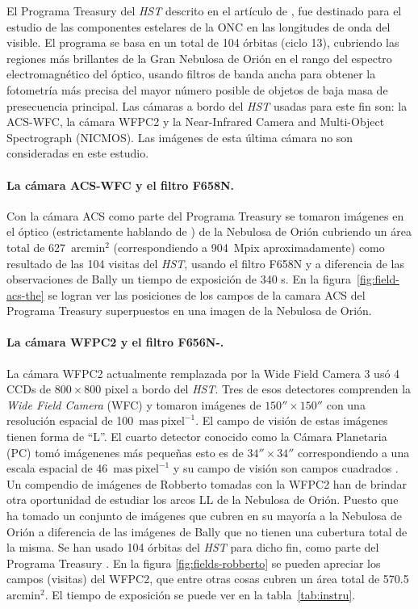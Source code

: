 El Programa Treasury del \textit{HST} descrito en el artículo de \citet{Robberto:2013a}, fue destinado para el estudio de las componentes estelares de la ONC en las longitudes de onda del visible. El programa se basa en un total de 104 órbitas (ciclo 13), cubriendo las regiones más brillantes de la Gran Nebulosa de Orión en el rango del espectro electromagnético del óptico, usando filtros de banda ancha para obtener la fotometría más precisa del mayor número posible de objetos de baja masa de presecuencia principal. Las cámaras a bordo del \textit{HST} usadas para este fin son: la ACS-WFC, la cámara WFPC2 y la Near-Infrared Camera and Multi-Object Spectrograph (NICMOS). Las imágenes de esta última cámara no son consideradas en este estudio. \\    

\paragraph{La cámara ACS-WFC y el filtro F658N.}
Con la cámara ACS como parte del Programa Treasury se tomaron imágenes en el óptico (estrictamente hablando de \ha{}) de la Nebulosa de Orión cubriendo un área total de 627~\(\mathrm{arcmin^2}\) (correspondiendo a 904~Mpix aproximadamente) como resultado de las 104 visitas del \textit{HST}, usando el filtro F658N y a diferencia de las observaciones de Bally un tiempo de exposición de 340 s. En la figura~\ref{fig:field-acs-the} se logran ver las posiciones de los campos de la camara ACS del Programa Treasury superpuestos en una imagen de la Nebulosa de Orión. \\

\paragraph{La cámara WFPC2 y el filtro F656N-\ha{}.}
La cámara WFPC2 actualmente remplazada por la Wide Field Camera 3 usó 4 CCDs de $800\times800$ pixel a bordo del \textit{HST}. Tres de esos detectores comprenden la \textit{Wide Field Camera} (WFC) y tomaron imágenes de \(150''\times150''\) con una resolución espacial de 100~\(\mathrm{mas~pixel^{-1}}\). El campo de visión de estas imágenes tienen forma de ``L''. El cuarto detector conocido como la  Cámara Planetaria (PC) tomó imágenenes más pequeñas esto es de \(34''\times34''\) correspondiendo a una escala espacial de 46~\(\mathrm{mas~pixel^{-1}}\) y su campo de visión son campos cuadrados \citep{McMaster:2008}. Un compendio de imágenes de Robberto tomadas con la WFPC2 han de brindar otra oportunidad de estudiar los arcos LL de la Nebulosa de Orión. Puesto que ha tomado un conjunto de imágenes que cubren en su mayoría a la Nebulosa de Orión a diferencia de las imágenes de Bally que no tienen una cubertura total de la misma. Se han usado 104 órbitas del \textit{HST} para dicho fin, como parte del Programa Treasury \citep{Robberto:2013a}. En la figura \ref{fig:fields-robberto} se pueden apreciar los campos (visitas) del WFPC2, que entre otras cosas cubren un área total de 570.5 \(\text{arcmin}^{2}\). El tiempo de exposición se puede ver en la tabla~\ref{tab:instru}. \\

